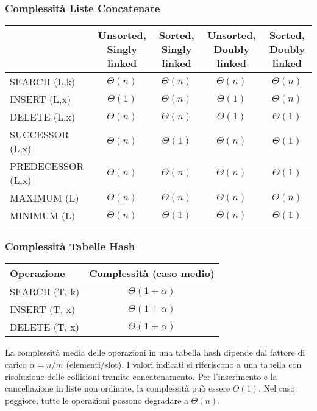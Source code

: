 \subsubsection{Complessità Liste Concatenate}

\begin{tabular}{|l|c|c|c|c|}
\hline
 & \shortstack{Unsorted, \\ Singly linked} & \shortstack{Sorted, \\ Singly linked} & \shortstack{Unsorted, \\ Doubly linked} & \shortstack{Sorted, \\ Doubly linked} \\
\hline
SEARCH (L,k) & $\Theta(n)$ & $\Theta(n)$ & $\Theta(n)$ & $\Theta(n)$ \\
\hline
INSERT (L,x) & $\Theta(1)$ & $\Theta(n)$ & $\Theta(1)$ & $\Theta(n)$ \\
\hline
DELETE (L,x) & $\Theta(n)$ & $\Theta(n)$ & $\Theta(1)$ & $\Theta(1)$ \\
\hline
SUCCESSOR (L,x) & $\Theta(n)$ & $\Theta(1)$ & $\Theta(n)$ & $\Theta(1)$ \\
\hline
PREDECESSOR (L,x) & $\Theta(n)$ & $\Theta(n)$ & $\Theta(n)$ & $\Theta(1)$ \\
\hline
MAXIMUM (L) & $\Theta(n)$ & $\Theta(n)$ & $\Theta(n)$ & $\Theta(n)$ \\
\hline
MINIMUM (L) & $\Theta(n)$ & $\Theta(1)$ & $\Theta(n)$ & $\Theta(1)$ \\
\hline
\end{tabular}

\subsubsection{Complessità Tabelle Hash}

\begin{tabular}{|l|c|}
\hline
\textbf{Operazione} & \textbf{Complessità (caso medio)} \\
\hline
SEARCH (T, k) & $\Theta(1+\alpha)$ \\
\hline
INSERT (T, x) & $\Theta(1+\alpha)$ \\
\hline
DELETE (T, x) & $\Theta(1+\alpha)$ \\
\hline
\end{tabular}

\vspace{2mm}
\footnotesize{La complessità media delle operazioni in una tabella hash dipende dal fattore di carico $\alpha = n/m$ (elementi/slot). I valori indicati si riferiscono a una tabella con risoluzione delle collisioni tramite concatenamento. Per l'inserimento e la cancellazione in liste non ordinate, la complessità può essere $\Theta(1)$. Nel caso peggiore, tutte le operazioni possono degradare a $\Theta(n)$.}

